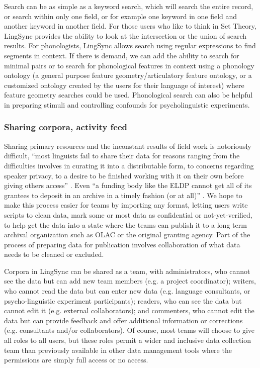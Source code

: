 \documentclass[letterpaper, 12pt, dvips]{mitwpl}
\begin{document}
Search can be as simple as a keyword search,
which will search the entire record,
or search within only one field,
or for example one keyword in one field and another keyword in another field.
For those users who like to think in Set Theory, LingSync provides the ability to look at the intersection or the union of search results. 
For phonologists, LingSync allows search using regular expressions to find segments in context.
If there is demand, we can add the ability to search for minimal pairs or to search for phonological features in context using a phonology ontology (a general purpose feature geometry/articulatory feature ontology,
or a customized ontology created by the users for their language of interest)  where feature geometry searches could be used.
Phonological search can also be helpful in %
preparing stimuli and controlling confounds for psycholinguistic experiments.


\subsubsection{Sharing corpora,
activity feed}
\label{sec:sharingactivityfeeds}

Sharing primary resources and the inconstant results of field work is notoriously difficult, 
``most linguists fail to share their data for reasons ranging from the difficulties involves in curating it into a distributable form, to concerns regarding speaker privacy, to a desire to be finished working with it on their own before giving others access'' \citep{Bender:2010}. Even ``a funding body like the ELDP cannot get all of its grantees to deposit in an archive in a timely fashion (or at all)'' \citep{Thieberger:2012}. We hope to make this process easier  for teams by importing any format, letting users write scripts to clean data, mark some or most data as confidential or not-yet-verified, to help get the data into a state where the teams can publish it to a long term archival organization such as OLAC or the original granting agency. Part of the process of preparing data for publication involves collaboration of what data needs to be cleaned or excluded.


Corpora in LingSync can be shared as a team,
with administrators,
who cannot see the data
but can add new team members (e.g.
a project coordinator); writers,
who cannot read the data but can enter new data (e.g.
language consultants,
or psycho-linguistic experiment participants); readers,
who can see the data but cannot edit it (e.g.
external collaborators); and commenters,
 who cannot edit the data but can provide feedback and offer additional information or corrections (e.g.
consultants and/or collaborators).
 Of course,
most teams will choose to give all roles to all users,
but these roles permit a wider and inclusive data collection team than previously available  in other data management tools where the permissions are simply full access or no access.
\end{document}
